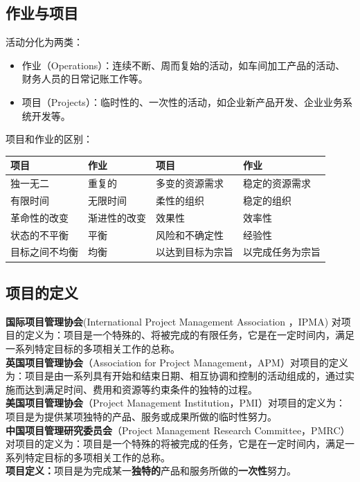 \subsection{作业与项目}
活动分化为两类：
\begin{itemize}
	\item 作业（Operations）：连续不断、周而复始的活动，如车间加工产品的活动、财务人员的日常记账工作等。
	\item 项目（Projects）：临时性的、一次性的活动，如企业新产品开发、企业业务系统开发等。
\end{itemize}
\par 项目和作业的区别：
\begin{table}[!h]
	\begin{tabular}{|l|l|l|l|}
		\hline
		项目&作业&项目&作业\\
		\hline
		独一无二&重复的&多变的资源需求&稳定的资源需求\\
		\hline
		有限时间&无限时间&柔性的组织&稳定的组织\\
		\hline
		革命性的改变&渐进性的改变&效果性&效率性\\
		\hline
		状态的不平衡&平衡&风险和不确定性&经验性\\
		\hline
		目标之间不均衡&均衡&以达到目标为宗旨&以完成任务为宗旨\\
		\hline
	\end{tabular}
\end{table}
\subsection{项目的定义}
\noindent \textbf{国际项目管理协会}(International Project Management Association ，IPMA) 对项目的定义为：项目是一个特殊的、将被完成的有限任务，它是在一定时间内，满足一系列特定目标的多项相关工作的总称。\\
\textbf{英国项目管理协会}（Association for Project Management，APM）对项目的定义为：项目是由一系列具有开始和结束日期、相互协调和控制的活动组成的，通过实施而达到满足时间、费用和资源等约束条件的独特的过程。\\
\textbf{美国项目管理协会}（Project Management Institution，PMI）对项目的定义为：项目是为提供某项独特的产品、服务或成果所做的临时性努力。\\
\textbf{中国项目管理研究委员会}（Project Management Research Committee，PMRC）对项目的定义为：项目是一个特殊的将被完成的任务，它是在一定时间内，满足一系列特定目标的多项相关工作的总称。\\
\textbf{项目定义：}项目是为完成某一\textbf{独特的}产品和服务所做的\textbf{一次性}努力。
